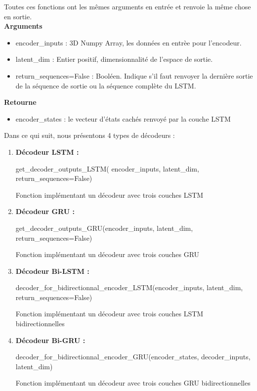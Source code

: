     Toutes ces fonctions ont les mêmes arguments en entrée et renvoie la même chose en sortie. \\
    \textbf{Arguments} 
    \begin{itemize}
        \item encoder\_inputs : 3D Numpy Array, les données en entrèe pour l'encodeur.
        \item latent\_dim : Entier positif, dimensionnalité de l'espace de sortie.
        \item return\_sequences=False : Booléen. Indique s'il faut renvoyer la dernière sortie de la séquence de sortie ou la séquence complète du LSTM.
    \end{itemize}
    \textbf{Retourne} 
    \begin{itemize}
        \item encoder\_states : le vecteur d'états cachés renvoyé par la couche LSTM
    \end{itemize}  
    Dans ce qui suit, nous présentons 4 types de décodeurs :
    \begin{enumerate}
        \item \textbf{Décodeur LSTM :} 
            \begin{tcolorbox}
            get\_decoder\_outputs\_LSTM( encoder\_inputs, latent\_dim, return\_sequences=False)
            \end{tcolorbox}
            Fonction implémentant un décodeur avec trois couches LSTM  \\
        \item \textbf{Décodeur GRU :}  
            \begin{tcolorbox}
            get\_decoder\_outputs\_GRU(encoder\_inputs, latent\_dim, return\_sequences=False)
            \end{tcolorbox}
            Fonction implémentant un décodeur avec trois couches GRU \\
        \item \textbf{Décodeur Bi-LSTM :}  
            \begin{tcolorbox}
            decoder\_for\_bidirectionnal\_encoder\_LSTM(encoder\_inputs, latent\_dim, return\_sequences=False)
            \end{tcolorbox}
            Fonction implémentant un décodeur avec trois couches LSTM bidirectionnelles \\
        \item \textbf{Décodeur Bi-GRU :} 
            \begin{tcolorbox}
            decoder\_for\_bidirectionnal\_encoder\_GRU(encoder\_states, decoder\_inputs, latent\_dim)
            \end{tcolorbox} 
            Fonction implémentant un décodeur avec trois couches GRU bidirectionnelles \\
    \end{enumerate}

